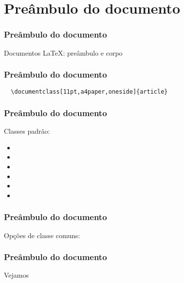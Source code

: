 \section{Preâmbulo do documento}

\begin{frame}
  \frametitle{Preâmbulo do documento}
  \LARGE
  Documentos \LaTeX: preâmbulo e corpo
\end{frame}

\begin{frame}[fragile]
  \frametitle{Preâmbulo do documento}
  \LARGE
  \begin{verbatim}
  \documentclass[11pt,a4paper,oneside]{article}
  \end{verbatim}
\end{frame}

\begin{frame}[fragile]
  \frametitle{Preâmbulo do documento}
  \huge
  Classes padrão:
  \begin{multicols}{2}
    \begin{itemize}
      \item{}
      \item{}
      \item{}
      \item{}
      \item{}
      \item{}
  \end{itemize}
\end{multicols}
\end{frame}

\begin{frame}
  \frametitle{Preâmbulo do documento}
  \LARGE
  Opções de classe comuns:
  \begin{itemize}
  \end{itemize}
\end{frame}

\begin{frame}
  \frametitle{Preâmbulo do documento}
  \huge
  Vejamos 
\end{frame}
